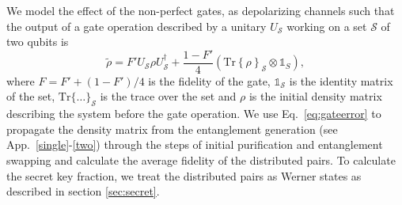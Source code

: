 We model the effect of the non-perfect gates, as depolarizing channels such that
the output of a gate operation described by a unitary $U_{\mathcal{S}}$ working
on a set $\mathcal{S}$ of two qubits is
\begin{equation} \label{eq:gateerror}
\tilde{\rho}=F'U_{\mathcal{S}}\rho
U^{\dagger}_{\mathcal{S}}+\frac{1-F'}{4}\left(\mathrm{Tr}
\left\{\rho\right\}_{\mathcal{S}}\otimes\mathds{1}_{S}\right),
\end{equation}
where $F=F'+(1-F')/4$ is the fidelity of the gate, $\mathds{1}_{\mathcal{S}}$ is
the identity matrix of the set, $\mathrm{Tr}\{\ldots\}_{\mathcal{S}}$ is the
trace over the set and $\rho$ is the initial density matrix describing the system
before the gate operation. We use Eq.~\eqref{eq:gateerror} to propagate the
density matrix from the entanglement generation (see
App.~\ref{single}-\ref{two}) through the steps of initial purification and
entanglement swapping and calculate the average fidelity of the distributed
pairs. To calculate the secret key fraction, we treat the distributed pairs as
Werner states as described in section \ref{sec:secret}.
